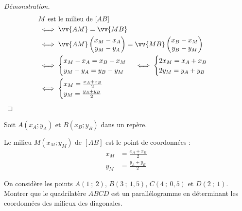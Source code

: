 \documentclass[main.tex]{subfiles}
\begin{document}
\begin{proof}[Démonstration]\hfill 
	\begin{align*}
		&\text{$M$ est le milieu de $[AB]$} \\
		& \iff \vv{AM}=\vv{MB} \\
		& \iff \vv{AM}\begin{pmatrix}
			x_M-x_A \\ y_M-y_A
		\end{pmatrix}=\vv{MB}\begin{pmatrix}
			x_B-x_M\\ y_B-y_M
		\end{pmatrix} \\
		& \iff \begin{cases}
			x_M-x_A = x_B-x_M  \\  y_M-y_A = y_B-y_M
		\end{cases} 
		\iff \begin{cases}
			2x_M = x_A + x_B  \\ 2y_M = y_A + y_B
		\end{cases} \\
		& \iff \begin{cases}
			x_M =\frac{x_A+x_B}{2} \\ y_M =\frac{y_A+y_B}{2}
		\end{cases}  
	\end{align*} 
\end{proof} 
\begin{theorem}
	Soit $A(x_A;y_A)$ et $B(x_B;y_B)$ dans un repère.
	
	Le milieu $M(x_M;y_M)$ de $[AB]$ est le point de coordonnées :
	\begin{align*}
		x_M&=\frac{x_A+x_B}{2}\\
		y_M&=\frac{y_A+y_B}{2}
	\end{align*}
\end{theorem} 


\begin{example}
	On considère les points $A(1~;~2)$, $B(3~;~1,5)$, $C(4~;~0,5)$ et $D(2~;~1)$.  
	Montrer que le quadrilatère $ABCD$ est un parallélogramme en déterminant les coordonnées des milieux des diagonales.
\end{example}
\vfill 


%	 
\end{document}
